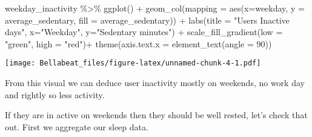 \documentclass[
]{article}
\newenvironment{Shaded}{\begin{snugshade}}{\end{snugshade}}
\newcommand{\AttributeTok}[1]{\textcolor[rgb]{0.77,0.63,0.00}{#1}}
\newcommand{\DecValTok}[1]{\textcolor[rgb]{0.00,0.00,0.81}{#1}}
\newcommand{\FunctionTok}[1]{\textcolor[rgb]{0.00,0.00,0.00}{#1}}
\newcommand{\NormalTok}[1]{#1}
\newcommand{\OtherTok}[1]{\textcolor[rgb]{0.56,0.35,0.01}{#1}}
\newcommand{\SpecialCharTok}[1]{\textcolor[rgb]{0.00,0.00,0.00}{#1}}
\newcommand{\StringTok}[1]{\textcolor[rgb]{0.31,0.60,0.02}{#1}}
\begin{document}
\begin{Shaded}
\begin{Highlighting}[]
\NormalTok{weekday\_inactivity }\SpecialCharTok{\%\textgreater{}\%}
  \FunctionTok{ggplot}\NormalTok{() }\SpecialCharTok{+}
  \FunctionTok{geom\_col}\NormalTok{(}\AttributeTok{mapping =} \FunctionTok{aes}\NormalTok{(}\AttributeTok{x=}\NormalTok{weekday, }\AttributeTok{y =}\NormalTok{ average\_sedentary, }\AttributeTok{fill =}\NormalTok{ average\_sedentary)) }\SpecialCharTok{+} 
  \FunctionTok{labs}\NormalTok{(}\AttributeTok{title =} \StringTok{"Users Inactive days"}\NormalTok{, }\AttributeTok{x=}\StringTok{"Weekday"}\NormalTok{, }\AttributeTok{y=}\StringTok{"Sedentary minutes"}\NormalTok{) }\SpecialCharTok{+} 
  \FunctionTok{scale\_fill\_gradient}\NormalTok{(}\AttributeTok{low =} \StringTok{"green"}\NormalTok{, }\AttributeTok{high =} \StringTok{"red"}\NormalTok{)}\SpecialCharTok{+}
  \FunctionTok{theme}\NormalTok{(}\AttributeTok{axis.text.x =} \FunctionTok{element\_text}\NormalTok{(}\AttributeTok{angle =} \DecValTok{90}\NormalTok{))}
\end{Highlighting}
\end{Shaded}

\texttt{[image: Bellabeat\_files/figure-latex/unnamed-chunk-4-1.pdf]}

From this visual we can deduce user inactivity mostly on weekends, no
work day and rightly so less activity.

If they are in active on weekends then they should be well rested, let's
check that out. First we aggregate our sleep data.

\begin{Shaded}
\end{Shaded}
\end{document}
